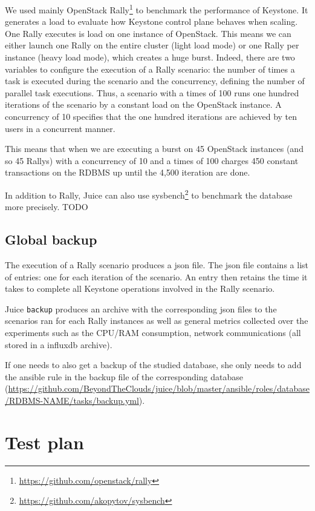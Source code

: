 We used mainly OpenStack Rally\footnote{\url{https://github.com/openstack/rally}} to benchmark the performance of Keystone. It generates a load to evaluate how Keystone control plane behaves when scaling.
One Rally executes is load on one instance of OpenStack. This means we can either launch one Rally on the entire cluster (light load mode) or one Rally per instance (heavy load mode), which creates a huge burst. Indeed, there are two variables to configure the execution of a Rally scenario: the number of times a task is executed during the scenario and the concurrency, defining the number of parallel task executions. Thus, a scenario with a times of 100 runs one hundred iterations of the scenario by a constant load on the OpenStack instance. A concurrency of 10 specifies that the one hundred iterations are achieved by ten users in a concurrent manner.

This means that when we are executing a burst on 45 OpenStack instances (and so 45 Rallys) with a concurrency of 10 and a times of 100 charges 450 constant transactions on the RDBMS up until the 4,500 iteration are done.

In addition to Rally, Juice can also use sysbench\footnote{\url{https://github.com/akopytov/sysbench}} to benchmark the database more precisely.
TODO


\subsection{Global backup}

The execution of a Rally scenario produces a json file. The json file contains a list of entries: one for each iteration of the scenario. An entry then retains the time it takes to complete all Keystone operations involved in the Rally scenario.

Juice \verb+backup+ produces an archive with the corresponding json files to the scenarios ran for each Rally instances as well as general metrics collected over the experiments such as the CPU/RAM consumption, network communications (all stored in a influxdb archive).

If one needs to also get a backup of the studied database, she only needs to add the ansible rule in the backup file of the corresponding database (\url{https://github.com/BeyondTheClouds/juice/blob/master/ansible/roles/database/RDBMS-NAME/tasks/backup.yml}).


\section{Test plan}
\label{sec:testplan}
